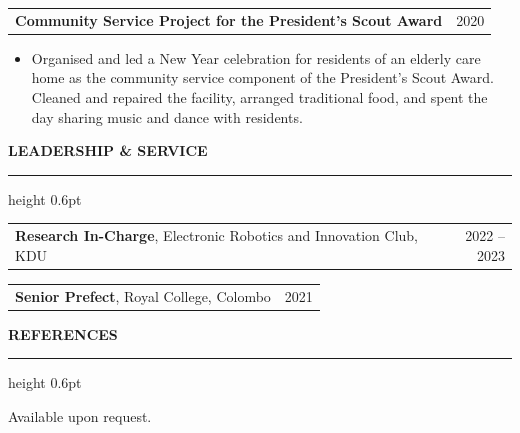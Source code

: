 \documentclass[11pt,letterpaper]{article}
\makeatletter
\renewcommand{\section}[1]{%
  \Needspace{6\baselineskip}%
  \vspace{7pt}%
  {\normalsize\bfseries\MakeUppercase{#1}}\par
  \vspace{1pt}\hrule height 0.6pt
  \vspace{3.5pt}%
}
\newcommand{\cventry}[2]{%
  \vspace{3pt}%
  \noindent\begin{tabularx}{\textwidth}{@{}X r@{}}
    #1 & #2
  \end{tabularx}\par\vspace{-0.5pt}%
}
\newenvironment{cvlist}
  {\begin{itemize}[leftmargin=1.1em,itemsep=1pt,parsep=0pt,topsep=1.5pt,
                   label=\textendash]}
  {\end{itemize}}
\makeatother
\begin{document}
\cventry{\textbf{Community Service Project for the President's Scout Award}}{2020}
\begin{cvlist}
  \item Organised and led a New Year celebration for residents of an elderly
        care home as the community service component of the President's Scout
        Award. Cleaned and repaired the facility, arranged traditional food, and
        spent the day sharing music and dance with residents.
\end{cvlist}

\section{Leadership \& Service}

\cventry{\textbf{Research In-Charge}, Electronic Robotics and Innovation Club, KDU}{2022 -- 2023}
\cventry{\textbf{Senior Prefect}, Royal College, Colombo}{2021}

\section{References}

Available upon request.
\end{document}
